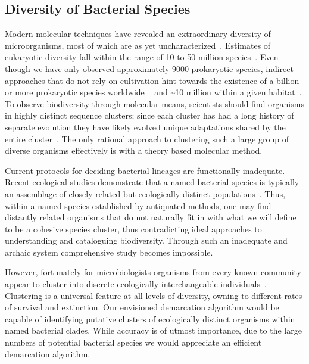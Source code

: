 \subsection{Diversity of Bacterial Species}
Modern molecular techniques have revealed an extraordinary diversity of microorganisms, most of which are as yet uncharacterized~\cite{bohannan2003new}.
Estimates of eukaryotic diversity fall within the range of 10 to 50 million species~\cite{may1988many}. Even though we have only observed approximately 9000 prokaryotic species, indirect approaches that do not rely on cultivation hint towards the existence of a billion or more prokaryotic species worldwide ~\cite{dykhuizen1998santa} and \textasciitilde10 million within a given habitat~\cite{gans2005computational}.
To observe biodiversity through molecular means, scientists should find organisms in highly distinct sequence clusters; since each cluster has had a long history of separate evolution they have likely evolved unique adaptations shared by the entire cluster~\cite{cohan2007systematics}.
The only rational approach to clustering such a large group of diverse organisms effectively is with a theory based molecular method.

Current protocols for deciding bacterial lineages are functionally inadequate.
Recent ecological studies demonstrate that a named bacterial species is typically an assemblage of closely related but ecologically distinct populations~\cite{cohan2007systematics}.
Thus, within a named species established by antiquated methods, one may find distantly related organisms that do not naturally fit in with what we will define to be a cohesive species cluster, thus contradicting ideal approaches to understanding and cataloguing biodiversity.
Through such an inadequate and archaic system comprehensive study becomes impossible.

However, fortunately for microbiologists organisms from every known community appear to cluster into discrete ecologically interchangeable individuals~\cite{cohan2007systematics}.
Clustering is a universal feature at all levels of diversity, owning to different rates of survival and extinction.
Our envisioned demarcation algorithm would be capable of identifying putative clusters of ecologically distinct organisms within named bacterial clades.
While accuracy is of utmost importance, due to the large numbers of potential bacterial species we would appreciate an efficient demarcation algorithm.

